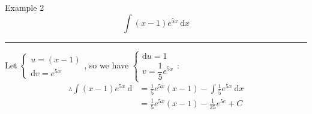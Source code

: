 \documentclass[12pt,a4paper]{article}
\def\d{{\mathrm{d}}}
\begin{document}
\begin{eg}{Example 2}
	$$\int (x-1)e^{5x}\ \d x$$
	\noindent\rule[0.25\baselineskip]{\textwidth}{1pt}
	Let $\begin{cases}u=(x-1)\\ \d v=e^{5x}\end{cases}$, so we have $\begin{cases}\d u=1\\ v=\dfrac{1}{5}e^{5x}\end{cases}$: 
	$$\begin{aligned}
		\therefore \int (x-1)e^{5x}\ \d&=\frac{1}{5}e^{5x}(x-1)-\int \frac{1}{5}e^{5x}\ \d x\\
		&=\frac{1}{5}e^{5x}(x-1)-\frac{1}{25}e^{5e}+C\\
	\end{aligned}$$
\end{eg}
\end{document}
